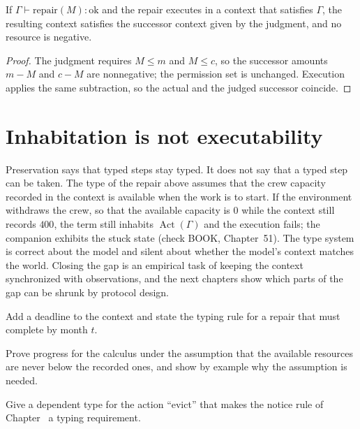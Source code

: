 \begin{proposition}\label{prop:pres}
If $\Gamma\vdash \mathrm{repair}(M):\mathrm{ok}$ and the repair executes in a context that satisfies $\Gamma$, the resulting context satisfies the successor context given by the judgment, and no resource is negative.
\end{proposition}

\begin{proof}
The judgment requires $M\le m$ and $M\le c$, so the successor amounts $m-M$ and $c-M$ are nonnegative; the permission set is unchanged. Execution applies the same subtraction, so the actual and the judged successor coincide.
\end{proof}

\section{Inhabitation is not executability}

Preservation says that typed steps stay typed. It does not say that a typed step can be taken. The type of the repair above assumes that the crew capacity recorded in the context is available when the work is to start. If the environment withdraws the crew, so that the available capacity is $0$ while the context still records $400$, the term still inhabits $\operatorname{Act}(\Gamma)$ and the execution fails; the companion exhibits the stuck state (check BOOK, Chapter~51). The type system is correct about the model and silent about whether the model's context matches the world. Closing the gap is an empirical task of keeping the context synchronized with observations, and the next chapters show which parts of the gap can be shrunk by protocol design.

\begin{exercise}Add a deadline to the context and state the typing rule for a repair that must complete by month $t$.\end{exercise}
\begin{exercise}Prove progress for the calculus under the assumption that the available resources are never below the recorded ones, and show by example why the assumption is needed.\end{exercise}
\begin{exercise}Give a dependent type for the action ``evict'' that makes the notice rule of Chapter~ a typing requirement.\end{exercise}

